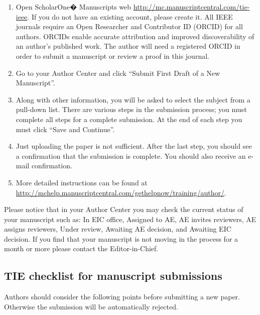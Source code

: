 \documentclass[journal]{IEEEtranTICPS}
\begin{document}
\begin{enumerate}[1)]
	\item Open ScholarOne� Manuscripts web \url{http://mc.manuscriptcentral.com/tie-ieee}. If you do not have an existing account, please create it. All IEEE journals require an Open Researcher and Contributor ID (ORCID) for all authors. ORCIDs enable accurate attribution and improved discoverability of an author's published work. The author will need a registered ORCID in order to submit a manuscript or review a proof in this journal.
	\item Go to your Author Center and click ``Submit First Draft of a New Manuscript''.
	\item Along with other information, you will be asked to select the subject from a pull-down list. There are various steps in the submission process; you must complete all steps for a complete submission. At the end of each step you must click ``Save and Continue''.
	\item Just uploading the paper is not sufficient. After the last step, you should see a confirmation that the submission is complete. You should also receive an e-mail confirmation.
	\item More detailed instructions can be found at \url{http://mchelp.manuscriptcentral.com/gethelpnow/training/author/}.
\end{enumerate}

Please notice that in your Author Center you may check the current status of your manuscript such as: In EIC office, Assigned to AE, AE invites reviewers, AE assigns reviewers, Under review, Awaiting AE decision, and Awaiting EIC decision. If you find that your manuscript is not moving in the process for a month or more please contact the Editor-in-Chief.

\subsection{TIE checklist for manuscript submissions}

Authors should consider the following points before submitting a new paper. Otherwise the submission will be automatically rejected.
\end{document}
